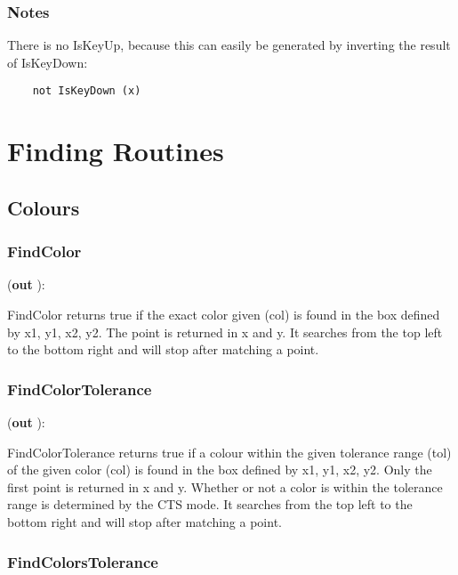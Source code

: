 \documentclass[a4paper]{report}
\begin{document}
\subsection{Notes}

There is no IsKeyUp, because this can easily be generated by inverting the
result of IsKeyDown:
\begin{verbatim}
    not IsKeyDown (x)
\end{verbatim}


\chapter{Finding Routines}

\section{Colours}

\subsection{FindColor}

\pfunc {} (\textbf{out}    
): 

FindColor returns true if the exact color given (col) is found in the box defined by x1, y1, x2, y2.
The point is returned in x and y. It searches from the top left to the bottom right and will stop
after matching a point.

\subsection{FindColorTolerance}

\pfunc {}(\textbf{out}   
): 

FindColorTolerance returns true if a colour within the given tolerance range (tol) of the given color (col)
is found in the box defined by x1, y1, x2, y2. Only the first point is returned in x and y.
Whether or not a color is within the tolerance range is determined by the CTS mode.
It searches from the top left to the bottom right and will stop after matching a point.

\subsection{FindColorsTolerance}
\end{document}
